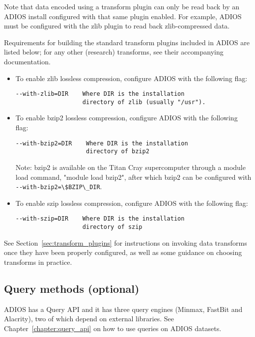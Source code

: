 Note that data encoded using a transform plugin can only be read
back by an ADIOS install configured with that same plugin enabled. For example,
ADIOS must be configured with the zlib plugin to read back zlib-compressed
data.

Requirements for building the standard transform plugins
included in ADIOS are listed below; for any other (research) transforms, see their accompanying
documentation.

\begin{itemize}
\item
To enable zlib lossless compression, configure ADIOS with the following flag:
\begin{lstlisting}
--with-zlib=DIR    Where DIR is the installation
                   directory of zlib (usually "/usr").
\end{lstlisting}

\item
To enable bzip2 lossless compression, configure ADIOS with the following flag:
\begin{lstlisting}
--with-bzip2=DIR    Where DIR is the installation
                    directory of bzip2
\end{lstlisting}
Note: bzip2 is available on the Titan Cray supercomputer through a module load command,
"module load bzip2", after which bzip2 can be configured with
\verb+--with-bzip2=\$BZIP\_DIR+.

\item
To enable szip lossless compression, configure ADIOS with the following flag:
\begin{lstlisting}
--with-szip=DIR    Where DIR is the installation
                   directory of szip
\end{lstlisting}
\end{itemize}

See Section~\ref{sec:transform_plugins} for instructions on invoking data transforms once they have been properly configured,
as well as some guidance on choosing transforms in practice.


\subsection{Query methods (optional)}
\label{sec:installation-query-api}

ADIOS has a Query API and it has three query engines (Minmax, FastBit and Alacrity), two of which depend on external libraries. 
See Chapter~\ref{chapter:query_api} on how to use queries on ADIOS datasets. 

